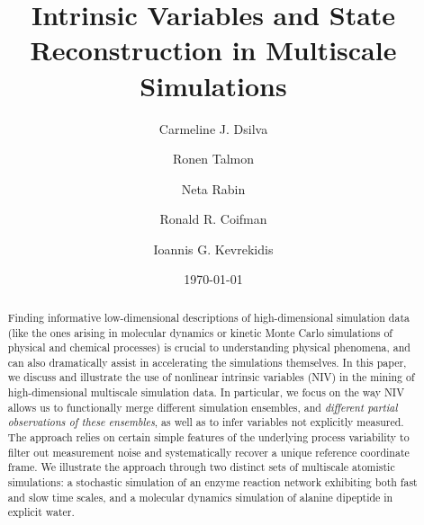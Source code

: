 \documentclass[aip,jcp,preprint]{revtex4-1}
\begin{document}
\title{Intrinsic Variables and State Reconstruction in Multiscale Simulations}

\author{Carmeline J. Dsilva}

\author{Ronen Talmon}

\author{Neta Rabin}

\author{Ronald R. Coifman}

\author{Ioannis G. Kevrekidis}

\date{\today}

\begin{abstract}
Finding informative low-dimensional descriptions of high-dimensional simulation data
(like the ones arising in molecular dynamics or kinetic Monte Carlo simulations of
physical and chemical processes) is crucial to understanding physical phenomena, and can
also dramatically assist in accelerating the simulations themselves.
%
In this paper, we discuss and illustrate the use of nonlinear intrinsic variables (NIV)
in the mining of high-dimensional multiscale simulation data.
%
In particular, we focus on the way NIV allows us to functionally merge different
simulation ensembles, and {\em different partial observations of these ensembles}, as well
as to infer variables not explicitly measured.
%
The approach relies on certain simple features of the underlying process variability to
filter out measurement noise and systematically recover a unique reference coordinate frame.
%
We illustrate the approach through two distinct sets of multiscale {\color{red} atomistic} simulations:
a stochastic simulation of an enzyme reaction network exhibiting both fast and slow time scales,
 and a molecular dynamics simulation of alanine dipeptide in explicit water.

\end{abstract}
\end{document}
